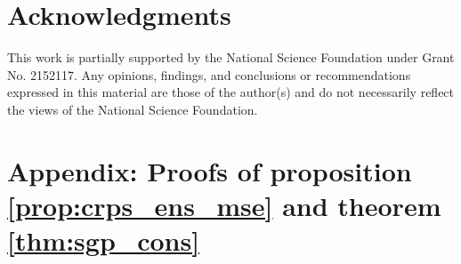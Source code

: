 \section{Acknowledgments}
This work is partially supported by the National Science Foundation under 
Grant No. 2152117. Any opinions, findings, and conclusions or recommendations 
expressed in this material are those of the author(s) and do not necessarily 
reflect the views of the National Science Foundation.


% 
% 


% 
% 


% 
%     

\section{Appendix: Proofs of proposition \ref{prop:crps_ens_mse} and theorem 
\ref{thm:sgp_cons}}

